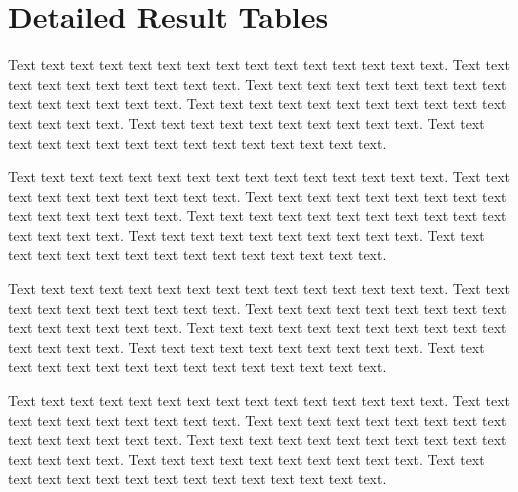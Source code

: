 \chapter{Detailed Result Tables}

Text text text text text text text text text text text text text text text. Text text text text text text text text text text. Text text text text text text text text text text text text text text text. Text text text text text text text text text text text text text text text. Text text text text text text text text text text. Text text text text text text text text text text text text text text text. 

Text text text text text text text text text text text text text text text. Text text text text text text text text text text. Text text text text text text text text text text text text text text text. Text text text text text text text text text text text text text text text. Text text text text text text text text text text. Text text text text text text text text text text text text text text text. 

Text text text text text text text text text text text text text text text. Text text text text text text text text text text. Text text text text text text text text text text text text text text text. Text text text text text text text text text text text text text text text. Text text text text text text text text text text. Text text text text text text text text text text text text text text text. 

Text text text text text text text text text text text text text text text. Text text text text text text text text text text. Text text text text text text text text text text text text text text text. Text text text text text text text text text text text text text text text. Text text text text text text text text text text. Text text text text text text text text text text text text text text text. 



